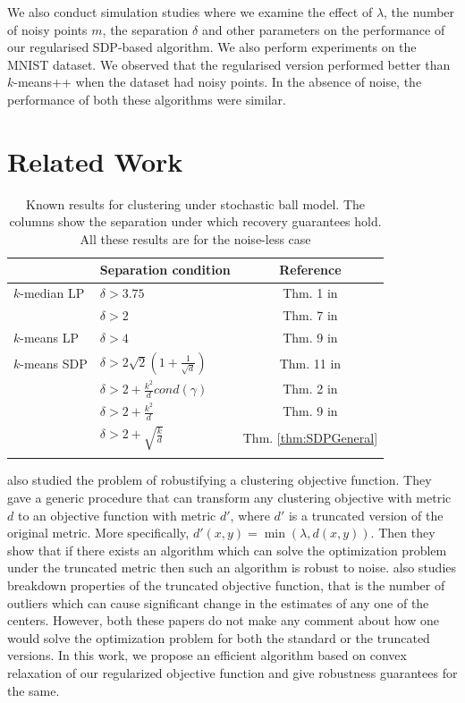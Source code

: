 \documentclass[12pt]{article}
\begin{document}
We also conduct simulation studies where we examine the effect of $\lambda$, the number of noisy points $m$, the separation $\delta$ and other parameters on the performance of our regularised SDP-based algorithm. We also perform experiments on the MNIST dataset. We observed that the regularised version performed better than $k$-means++ when the dataset had noisy points. In the absence of noise, the performance of both these algorithms were similar. 

\section{Related Work}
\begin{table}
\centering
\caption{Known results for clustering under stochastic ball model. The columns show the separation under which recovery guarantees hold. All these results are for the noise-less case}

\label{table:stochasticBall}
\setlength{\tabcolsep}{0.5em} 
{\renewcommand{\arraystretch}{1.2}%
\begin{tabular}{llc}
\\
 & Separation condition & Reference\\
 \hline
$k$-median LP & $\delta > 3.75$ & Thm. 1 in \cite{nellore2015recovery}\\
 & $\delta > 2$ & Thm. 7 in \cite{awasthi2015relax}\\
\hline
$k$-means LP & $\delta > 4$ & Thm. 9 in \cite{nellore2015recovery}\\
\hline
$k$-means SDP & $\delta > 2\sqrt2 (1 + \frac{1}{\sqrt d})$ & Thm. 11 in \cite{awasthi2015relax}\\
 & $\delta > 2 + \frac{k^2}{d}cond(\gamma)$ & Thm. 2 in \cite{iguchi2015tightness}\\
 & $\delta > 2 + \frac{k^2}{d}$ & Thm. 9 in \cite{iguchi2017probably}\\
 & $\delta > 2 + \sqrt{\frac{k}{d}}$ & Thm. \ref {thm:SDPGeneral}\\
\hline


\label{table:alphacenter}
\end{tabular}
}
\end{table}
\cite{ben2014clustering} also studied the problem of robustifying a clustering objective function. They gave a generic procedure that can transform any clustering objective with metric $d$ to an objective function with metric $d'$, where $d'$ is a truncated version of the original metric. More specifically, $d'(x, y) = \min (\lambda,   d(x,y)).$ Then they show that if there exists an algorithm which can solve the optimization problem under the truncated metric then such an algorithm is robust to noise. \cite{georgogiannis2016robust}  also studies breakdown properties of the truncated objective function, that is the number of outliers which can cause significant change in the estimates of any one of the centers. However, both these papers do not make any comment about how one would solve the optimization problem for both the standard or the truncated versions. In this work, we propose an efficient algorithm based on convex relaxation of our regularized objective function and give robustness guarantees for the same. 
\end{document}
